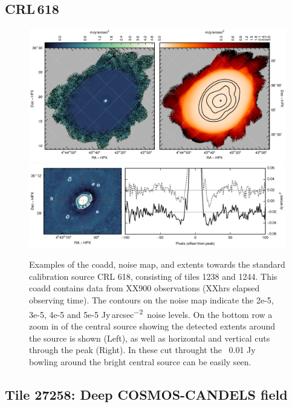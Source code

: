 \documentclass[twocolumn]{aastex6}
\newcommand{\jyas}{Jy\,arcsec\textsuperscript{$-$2}}
\begin{document}
\subsection{CRL\,618}
\begin{figure}
  \centering
  \includegraphics{crl618-whole-map.pdf}
  \\[3mm]
  \includegraphics{crl618-sourceonly.pdf}
  \caption{Examples of the coadd, noise map, and extents towards the
    standard calibration source CRL 618, consisting of tiles 1238 and
    1244. This coadd contains data from XX900 observations (XXhrs elapsed
    observing time). The contours on the noise map indicate the 2e-5,
    3e-5, 4e-5 and 5e-5 \jyas\ noise
    levels. On the bottom row a zoom in of the central source showing
    the detected extents around the source is shown (Left), as well as
    horizontal and vertical cuts through the peak (Right). In these
    cut throught the ~0.01 Jy bowling around the bright central source
    can be easily seen. }
  \label{fig:crl618}
\end{figure}

\subsection{Tile 27258: Deep COSMOS-CANDELS field}
\end{document}

